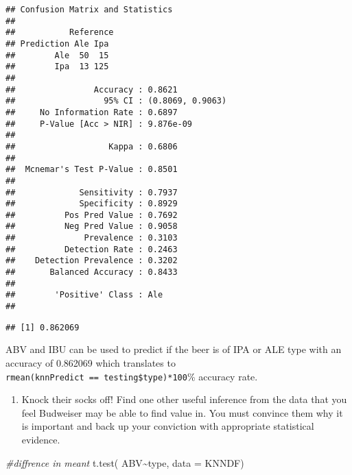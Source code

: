 \documentclass[
]{article}
\newenvironment{Shaded}{\begin{snugshade}}{\end{snugshade}}
\newcommand{\AttributeTok}[1]{\textcolor[rgb]{0.77,0.63,0.00}{#1}}
\newcommand{\CommentTok}[1]{\textcolor[rgb]{0.56,0.35,0.01}{\textit{#1}}}
\newcommand{\FunctionTok}[1]{\textcolor[rgb]{0.00,0.00,0.00}{#1}}
\newcommand{\NormalTok}[1]{#1}
\newcommand{\SpecialCharTok}[1]{\textcolor[rgb]{0.00,0.00,0.00}{#1}}
\providecommand{\tightlist}{%
  \setlength{\itemsep}{0pt}\setlength{\parskip}{0pt}}
\begin{document}
\begin{verbatim}
## Confusion Matrix and Statistics
## 
##           Reference
## Prediction Ale Ipa
##        Ale  50  15
##        Ipa  13 125
##                                           
##                Accuracy : 0.8621          
##                  95% CI : (0.8069, 0.9063)
##     No Information Rate : 0.6897          
##     P-Value [Acc > NIR] : 9.876e-09       
##                                           
##                   Kappa : 0.6806          
##                                           
##  Mcnemar's Test P-Value : 0.8501          
##                                           
##             Sensitivity : 0.7937          
##             Specificity : 0.8929          
##          Pos Pred Value : 0.7692          
##          Neg Pred Value : 0.9058          
##              Prevalence : 0.3103          
##          Detection Rate : 0.2463          
##    Detection Prevalence : 0.3202          
##       Balanced Accuracy : 0.8433          
##                                           
##        'Positive' Class : Ale             
## 
\end{verbatim}

\begin{Shaded}
\end{Shaded}

\begin{verbatim}
## [1] 0.862069
\end{verbatim}

ABV and IBU can be used to predict if the beer is of IPA or ALE type
with an accuracy of 0.862069 which translates to
\texttt{rmean(knnPredict\ ==\ testing\$type)*100}\% accuracy rate.

\begin{enumerate}
\def\labelenumi{\arabic{enumi}.}
\setcounter{enumi}{8}
\tightlist
\item
  Knock their socks off! Find one other useful inference from the data
  that you feel Budweiser may be able to find value in. You must
  convince them why it is important and back up your conviction with
  appropriate statistical evidence.
\end{enumerate}

\begin{Shaded}
\begin{Highlighting}[]
\CommentTok{\#diffrence in meant}
\FunctionTok{t.test}\NormalTok{( ABV}\SpecialCharTok{\textasciitilde{}}\NormalTok{type, }\AttributeTok{data =}\NormalTok{ KNNDF)}
\end{Highlighting}
\end{Shaded}
\end{document}
